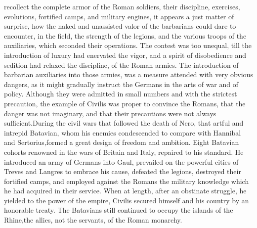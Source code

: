 recollect the complete armor of the Roman soldiers, their
discipline, exercises, evolutions, fortified camps, and military
engines, it appears a just matter of surprise, how the naked and
unassisted valor of the barbarians could dare to encounter, in
the field, the strength of the legions, and the various troops of
the auxiliaries, which seconded their operations. The contest was
too unequal, till the introduction of luxury had enervated the
vigor, and a spirit of disobedience and sedition had relaxed the
discipline, of the Roman armies. The introduction of barbarian
auxiliaries into those armies, was a measure attended with very
obvious dangers, as it might gradually instruct the Germans in
the arts of war and of policy. Although they were admitted in
small numbers and with the strictest precaution, the example of
Civilis was proper to convince the Romans, that the danger was
not imaginary, and that their precautions were not always
sufficient.\footnotemark[74] During the civil wars that followed the death of
Nero, that artful and intrepid Batavian, whom his enemies
condescended to compare with Hannibal and Sertorius,\footnotemark[75] formed a
great design of freedom and ambition. Eight Batavian cohorts
renowned in the wars of Britain and Italy, repaired to his
standard. He introduced an army of Germans into Gaul, prevailed
on the powerful cities of Treves and Langres to embrace his
cause, defeated the legions, destroyed their fortified camps, and
employed against the Romans the military knowledge which he had
acquired in their service. When at length, after an obstinate
struggle, he yielded to the power of the empire, Civilis secured
himself and his country by an honorable treaty. The Batavians
still continued to occupy the islands of the Rhine,\footnotemark[76] the
allies, not the servants, of the Roman monarchy.





